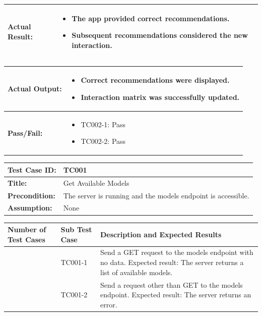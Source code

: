 \noindent
\begin{tabularx}{\textwidth}{|>{\raggedright\arraybackslash}p{4cm}|X|}
    \hline
    \textbf{Actual Result:} & 
    \begin{itemize}
        \item The app provided correct recommendations.
        \item Subsequent recommendations considered the new interaction.
    \end{itemize}
    \\ \hline
\end{tabularx}

\noindent
\begin{tabularx}{\textwidth}{|>{\raggedright\arraybackslash}p{4cm}|X|}
    \hline
    \textbf{Actual Output:} & 
    \begin{itemize}
        \item Correct recommendations were displayed.
        \item Interaction matrix was successfully updated.
    \end{itemize}
    \\ \hline
    \textbf{Pass/Fail:} & 
    \begin{itemize}
        \item TC002-1: Pass
        \item TC002-2: Pass
    \end{itemize}
    \\ \hline
\end{tabularx}

\noindent
\begin{tabularx}{\textwidth}{|>{\raggedright\arraybackslash}p{4cm}|X|}
    \hline
    \textbf{Test Case ID:} & TC001 \\ \hline
    \textbf{Title:} & Get Available Models \\ \hline
    \textbf{Precondition:} & The server is running and the models endpoint is accessible. \\ \hline
    \textbf{Assumption:} & None \\ \hline
\end{tabularx}

\noindent
\begin{tabularx}{\textwidth}{|>{\centering\arraybackslash}p{3cm}|>{\centering\arraybackslash}p{3cm}|X|}
    \hline
    \textbf{Number of Test Cases} & \textbf{Sub Test Case} & \textbf{Description and Expected Results} \\ \hline
    1 & TC001-1 & Send a GET request to the models endpoint with no data. Expected result: The server returns a list of available models. \\ \hline
    2 & TC001-2 & Send a request other than GET to the models endpoint. Expected result: The server returns an error. \\ \hline
\end{tabularx}

